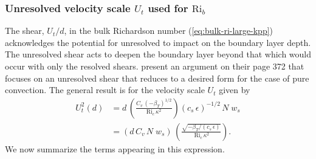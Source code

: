 \subsubsection{Unresolved velocity scale $U_{t}$ used for $\mbox{Ri}_{b}$}
\label{subsubsection:unresolved-shear}

The shear, $U_{t}/d$, in the bulk Richardson number
(\ref{eq:bulk-ri-large-kpp}) acknowledges the potential for unresolved
to impact on the boundary layer depth.  The unresolved shear acts to
deepen the boundary layer beyond that which would occur with only the
resolved shears.  \cite{LargeKPP} present an argument on their page
372 that focuses on an unresolved shear that reduces to a desired form
for the case of pure convection.  The general result is for the
velocity scale $U_{t}$ given by
\begin{subequations}
\begin{align}
 U_{t}^{2}(d) &= 
  d \, \left( \frac{C_{v} \,  (-\beta_{T})^{1/2}}{\mbox{Ri}_{c} \, \kappa^{2}} \right)
  (c_{s} \, \epsilon)^{-1/2} \, N \; w_{s}
 \\
 &= ( d \, C_{v} \, N \; w_{s} ) \, \left( \frac{ \sqrt{-\beta_{T} /  (c_{s} \, \epsilon) } }{ \, \mbox{Ri}_{c} \, \kappa^{2}} \right).
\label{eq:unresolved-shear-kpp}
\end{align}
\end{subequations}
We now summarize the terms appearing in this expression.
